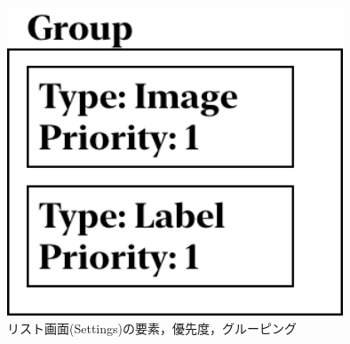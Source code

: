 \begin{figure}[htbp]
  \begin{minipage}{\hsize}
    \begin{center}
       \includegraphics[width=100mm]{img/Settings_ViewStructure.png}
    \end{center}
    \caption{リスト画面(Settings)の要素，優先度，グルーピング}
    \label{fig:Settings_ViewStructure}
  \end{minipage}
\end{figure}

